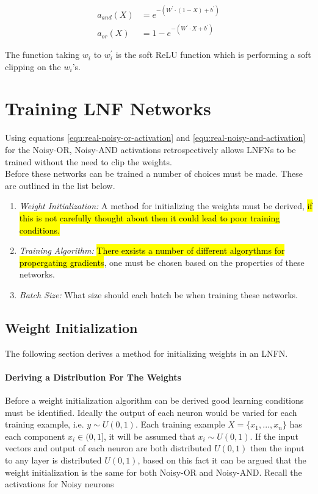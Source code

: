 \begin{align}
a_{and}(X) &= e^{-(W^{'} \cdot (1 - X) + b^{'})} \label{equ:real-noisy-and-activation}\\
a_{or}(X)&= 1 - e^{-(W^{'} \cdot X + b^{'})} \label{equ:real-noisy-or-activation}
\end{align}

The function taking $w_i$ to $w_i^{'}$ is the soft ReLU function which is performing a soft clipping on the $w_i$'s. 

\section{Training LNF Networks}
Using equations \ref{equ:real-noisy-or-activation} and \ref{equ:real-noisy-and-activation} for the Noisy-OR, Noisy-AND activations retrospectively allows LNFNs to be trained without the need to clip the weights.\\

Before these networks can be trained a number of choices must be made. These are outlined in the list below.

\begin{enumerate}
	\item \textit{Weight Initialization:} A method for initializing the weights must be derived, \hl{if this is not carefully thought about then it could lead to poor training conditions.}
	\item \textit{Training Algorithm:} \hl{There exsists a number of different algorythms for propergating gradients}, one must be chosen based on the properties of these networks.
	\item \textit{Batch Size:} What size should each batch be when training these networks.
\end{enumerate}

\subsection{Weight Initialization}
The following section derives a method for initializing weights in an LNFN.

\paragraph{Deriving a Distribution For The Weights}
Before a weight initialization algorithm can be derived good learning conditions must be identified. Ideally the output of each neuron would be varied for each training example, i.e. $y \sim U(0,1)$. Each training example $X = \{x_1, ..., x_n\}$ has each component $x_i \in (0,1]$, it will be assumed that $x_i \sim U(0,1)$. If the input vectors and output of each neuron are both distributed $U(0,1)$ then the input to any layer is distributed $U(0,1)$, based on this fact it can be argued that the weight initialization is the same for both Noisy-OR and Noisy-AND. Recall the activations for Noisy neurons\\

